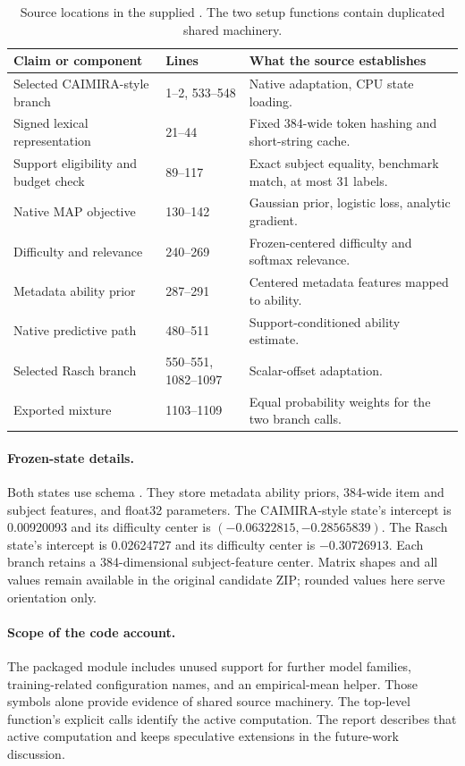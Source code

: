 \begin{table}[H]
\centering
\caption{Source locations in the supplied . The two setup functions contain duplicated shared machinery.}
\small
\begin{tabularx}{\linewidth}{@{}p{.39\linewidth}p{.15\linewidth}>{\raggedright\arraybackslash}X@{}}
\toprule
Claim or component & Lines & What the source establishes \\
\midrule
Selected CAIMIRA-style branch & 1--2, 533--548 & Native adaptation, CPU state loading. \\
Signed lexical representation & 21--44 & Fixed 384-wide token hashing and short-string cache. \\
Support eligibility and budget check & 89--117 & Exact subject equality, benchmark match, at most 31 labels. \\
Native MAP objective & 130--142 & Gaussian prior, logistic loss, analytic gradient. \\
Difficulty and relevance & 240--269 & Frozen-centered difficulty and softmax relevance. \\
Metadata ability prior & 287--291 & Centered metadata features mapped to ability. \\
Native predictive path & 480--511 & Support-conditioned ability estimate. \\
Selected Rasch branch & 550--551, 1082--1097 & Scalar-offset adaptation. \\
Exported mixture & 1103--1109 & Equal probability weights for the two branch calls. \\
\bottomrule
\end{tabularx}
\end{table}

\paragraph{Frozen-state details.}
Both states use schema . They store metadata ability priors, 384-wide item and subject features, and float32 parameters. The CAIMIRA-style state's intercept is 0.00920093 and its difficulty center is $(-0.06322815,-0.28565839)$. The Rasch state's intercept is 0.02624727 and its difficulty center is $-0.30726913$. Each branch retains a 384-dimensional subject-feature center. Matrix shapes and all values remain available in the original candidate ZIP; rounded values here serve orientation only.

\paragraph{Scope of the code account.}
The packaged module includes unused support for further model families, training-related configuration names, and an empirical-mean helper. Those symbols alone provide evidence of shared source machinery. The top-level function's explicit calls identify the active computation. The report describes that active computation and keeps speculative extensions in the future-work discussion.


